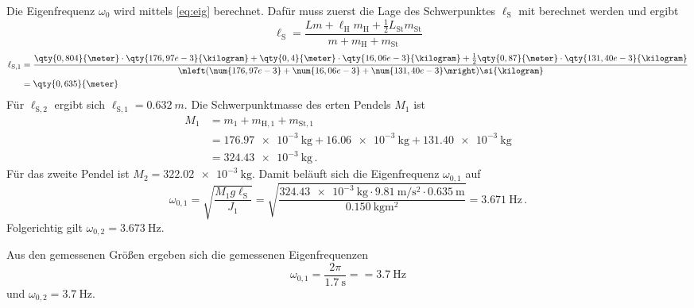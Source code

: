\documentclass[
12pt,
a4paper,
bibliography=totocnumbered, %
BCOR=1cm, %
oneside, %
]{scrartcl}
\newcommand{\lh}{\ell_{\mathrm{H}}}
\newcommand{\ls}{\ell_{\mathrm{S}}}
\begin{document}
Die Eigenfrequenz \(\omega_0\) wird mittels \autoref{eq:eig} %
berechnet. Dafür muss zuerst die Lage des Schwerpunktes \(\ls\) mit %
berechnet werden und ergibt
\begin{equation}
	\ls = \frac{Lm + \lh m_{\text{H}} + \tfrac{1}{2} L_{\text{St}} m_{\text{St}}}{m + m_{\text{H}} + m_{\text{St}}}
\end{equation}
\begin{equation}
	\begin{split}
		\ell_{\text{S},1} &= \frac{\qty{0,804}{\meter} \cdot \qty{176,97e-3}{\kilogram} + \qty{0,4}{\meter} \cdot \qty{16,06e-3}{\kilogram} + \tfrac{1}{2}\qty{0,87}{\meter} \cdot \qty{131,40e-3}{\kilogram}}{\mleft(\num{176,97e-3} + \num{16,06e-3} + \num{131,40e-3}\mright)\si{\kilogram}}\\
		&= \qty{0,635}{\meter}
	\end{split}
\end{equation}
Für \(\ell_{\text{S},2}\) ergibt sich \(\ell_{\text{S},1} = \qty{0,632}{m}\). Die Schwerpunktmasse des erten Pendels \(M_1\) ist
\begin{equation}
	\begin{split}
		M_1 &= m_1 + m_{\text{H},1} + m_{\text{St},1}\\
		&= \qty{176,97e-3}{\kilogram} + \qty{16,06e-3}{\kilogram} + \qty{131,40e-3}{\kilogram}\\
		&= \qty{324,43e-3}{\kilogram} \,.
	\end{split}
\end{equation}
Für das zweite Pendel ist \(M_2 = \qty{322,02e-3}{\kilogram}\). Damit beläuft sich die Eigenfrequenz \(\omega_{0,1}\) auf
\begin{equation}
	\omega_{0,1} = \sqrt{\frac{M_1 g \ls}{J_1}} = \sqrt{\frac{\qty{324,43e-3}{\kilogram} \cdot \qty{9,81}{\meter\per\second\squared} \cdot \qty{0,635}{\meter}}{\qty{0,150}{\kilogram\meter\squared}}} = \qty{3,671}{\hertz} \,.
\end{equation}
Folgerichtig gilt \(\omega_{0,2} = \qty{3,673}{\hertz}\).

Aus den gemessenen Größen ergeben sich die gemessenen Eigenfrequenzen
\begin{equation}
	\omega_{0,1} = \frac{2\pi}{\qty{1,7}{\second}} = = \qty{3,7}{\hertz}
\end{equation}
und \(\omega_{0,2} = \qty{3,7}{\hertz}\).
\end{document}
